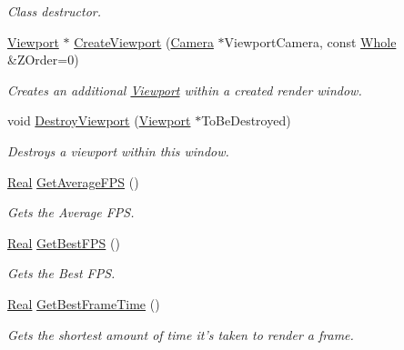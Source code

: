 \begin{DoxyCompactItemize}
\begin{DoxyCompactList}\small\item\em Class destructor. \item\end{DoxyCompactList}\item 
\hyperlink{classMezzanine_1_1Viewport}{Viewport} $\ast$ \hyperlink{classMezzanine_1_1GameWindow_a9a5c31130d7d2970d1c0141173bcdce3}{CreateViewport} (\hyperlink{classMezzanine_1_1Camera}{Camera} $\ast$ViewportCamera, const \hyperlink{namespaceMezzanine_adcbb6ce6d1eb4379d109e51171e2e493}{Whole} \&ZOrder=0)
\begin{DoxyCompactList}\small\item\em Creates an additional \hyperlink{classMezzanine_1_1Viewport}{Viewport} within a created render window. \item\end{DoxyCompactList}\item 
void \hyperlink{classMezzanine_1_1GameWindow_a810561a4b96667bf88be137722d44407}{DestroyViewport} (\hyperlink{classMezzanine_1_1Viewport}{Viewport} $\ast$ToBeDestroyed)
\begin{DoxyCompactList}\small\item\em Destroys a viewport within this window. \item\end{DoxyCompactList}\item 
\hyperlink{namespaceMezzanine_a726731b1a7df72bf3583e4a97282c6f6}{Real} \hyperlink{classMezzanine_1_1GameWindow_ad6dcba20b92b4881a35a872ba36037d5}{GetAverageFPS} ()
\begin{DoxyCompactList}\small\item\em Gets the Average FPS. \item\end{DoxyCompactList}\item 
\hyperlink{namespaceMezzanine_a726731b1a7df72bf3583e4a97282c6f6}{Real} \hyperlink{classMezzanine_1_1GameWindow_a366478a0038149d243d0ef19eacea696}{GetBestFPS} ()
\begin{DoxyCompactList}\small\item\em Gets the Best FPS. \item\end{DoxyCompactList}\item 
\hyperlink{namespaceMezzanine_a726731b1a7df72bf3583e4a97282c6f6}{Real} \hyperlink{classMezzanine_1_1GameWindow_add46a3048c8eb963dae0758c47316bc4}{GetBestFrameTime} ()
\begin{DoxyCompactList}\small\item\em Gets the shortest amount of time it's taken to render a frame. \item\end{DoxyCompactList}\item 

\end{DoxyCompactItemize}
